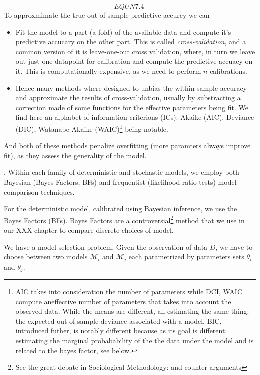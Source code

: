 \begin{equation}
	EQUN 7.4~\label{eq:llik}
\end{equation}
To approxmimate the true out-of sample predictive accurcy we can 
\begin{itemize}
	\item Fit the model to a part (a fold) of the available data and compute it’s predictive accucary on the other part. This is called \emph{cross-validation}, and a common version of it is leave-one-out cross validation, where, in turn we leave out just one datapoint for calibration and compute the predictive accuacy on it. This is computationally expensive, as we need to perform $n$ calibrations.
	\item Hence many methods where designed to unbias the within-sample accuracy and approximate the results of cross-validation, usually by substracting  a correction made of some functions for the effective parameters being fit. We find here an alphabet of information criterions (ICs):  Akaike (AIC), Deviance  (DIC), Watanabe-Akaike (WAIC)\footnote{AIC takes into consideration the number of parameters while DCI, WAIC compute aneffective number of parameters that takes into account the observed data. While the means are different,  all estimating the same thing: the expected out-of-sample deviance associated with a model. BIC, introduced futher, is notably different because as its goal is different: estimating the marginal probabability of the the data under the model and is related to the bayes factor, see below.} being notable.
\end{itemize}
And both of these methods penalize overfitting (more paramters always improve fit), as they assess the generality of the model.




. Within each family of deterministic and stochastic models, we employ both Bayesian (Bayes Factors, BFs) and frequentist (likelihood ratio tests) model comparison techniques. 

For the deterministic model, calibrated using Bayesian inference, we use the Bayes Factors (BFs). Bayes Factors are a controversial\footnote{See the great debate in Sociological Methodology: and counter arguments} method that we use in our XXX chapter to compare discrete choices of model.

We have a model selection problem. Given the observation of data $D$, we have to choose between two models $\mathcal{M}_i$ and $\mathcal{M}_j$ each parametrized by parameters sets $\theta_i$ and $\theta_j$.

